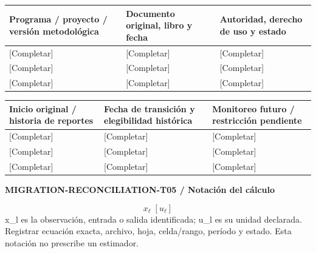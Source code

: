 {\sffamily\fontsize{8.3}{10.3}\selectfont\begin{longtable}{@{}P{54.83mm} P{54.83mm} P{54.83mm}@{}}
\toprule
\textbf{Programa / proyecto / versión metodológica} & \textbf{Documento original, libro y fecha} & \textbf{Autoridad, derecho de uso y estado}\\\midrule\endhead
\rule{0pt}{8mm}[Completar] & [Completar] & [Completar]\\\hline
\rule{0pt}{8mm}[Completar] & [Completar] & [Completar]\\\hline
\rule{0pt}{8mm}[Completar] & [Completar] & [Completar]\\\hline
\end{longtable}}
{\sffamily\fontsize{8.3}{10.3}\selectfont\begin{longtable}{@{}P{54.83mm} P{54.83mm} P{54.83mm}@{}}
\toprule
\textbf{Inicio original / historia de reportes} & \textbf{Fecha de transición y elegibilidad histórica} & \textbf{Monitoreo futuro / restricción pendiente}\\\midrule\endhead
\rule{0pt}{8mm}[Completar] & [Completar] & [Completar]\\\hline
\rule{0pt}{8mm}[Completar] & [Completar] & [Completar]\\\hline
\rule{0pt}{8mm}[Completar] & [Completar] & [Completar]\\\hline
\end{longtable}}
\par\begingroup\sffamily\fontsize{8}{10}\selectfont\color{NEBGreen}\setlength{\parskip}{2pt}\setlength{\abovedisplayskip}{4pt}\setlength{\belowdisplayskip}{4pt}\setlength{\abovedisplayshortskip}{2pt}\setlength{\belowdisplayshortskip}{3pt}
\textbf{MIGRATION-RECONCILIATION-T05 / Notación del cálculo}\par
{\fontsize{9}{11}\selectfont\[ x_{\ell}\;[u_{\ell}] \]}
x\_l es la observación, entrada o salida identificada; u\_l es su unidad declarada. Registrar ecuación exacta, archivo, hoja, celda/rango, período y estado. Esta notación no prescribe un estimador.\par
